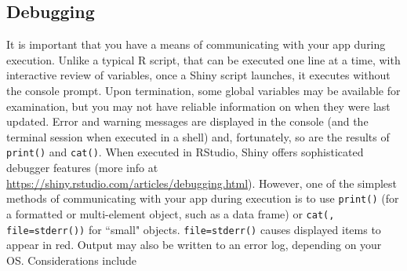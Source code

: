 \documentclass[10pt, letterpaper]{article}
\begin{document}
\begin{spacing}{1.0}

\section{Debugging}\label{sec:debugging}

It is important that you have a means of communicating with your app during execution.  Unlike a typical R script, that can be executed one line at a time, with interactive review of variables, once a Shiny script launches, it executes without the console prompt.  Upon termination, some global variables may be available for examination, but you may not have reliable information on when they were last updated.  Error and warning messages are displayed in the console (and the terminal session when executed in a shell) and, fortunately, so are the results of \texttt{print()} and \texttt{cat()}.  When executed in RStudio, Shiny offers sophisticated debugger features (more info at \url{https://shiny.rstudio.com/articles/debugging.html}).  However, one of the simplest methods of communicating with your app during execution is to use \texttt{print()} (for a formatted or multi-element object, such as a data frame) or \texttt{cat(, file=stderr())} for ``small" objects.  \texttt{file=stderr()} causes displayed items to appear in red.  Output may also be written to an error log, depending on your OS.  Considerations include


\end{spacing}
\end{document}
